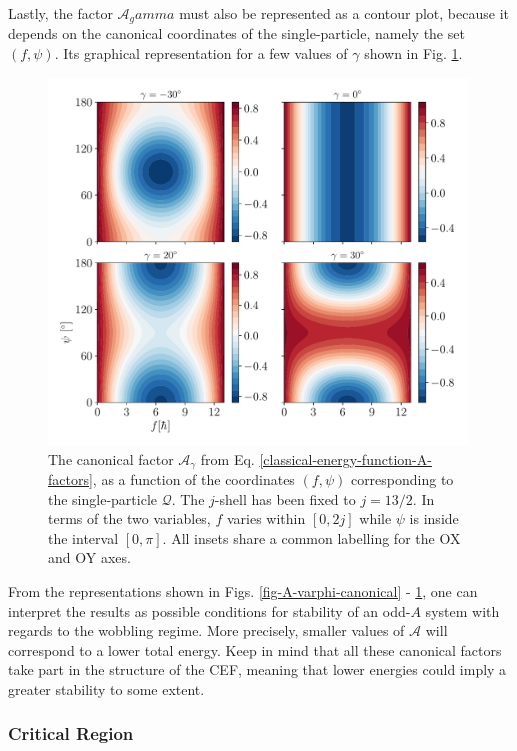 Lastly, the factor $\mathcal{A}_gamma$ must also be represented as a contour plot, because it depends on the canonical coordinates of the single-particle, namely the set $(f,\psi)$. Its graphical representation for a few values of $\gamma$ shown in Fig. \ref{fig-A-gamma-canonical}.
\begin{figure}
    \centering
    \includegraphics[width=0.99\textwidth]{Chapters/Figures/A_gamma.pdf}
    \caption{The canonical factor $\mathcal{A}_\gamma$ from Eq. \ref{classical-energy-function-A-factors}, as a function of the coordinates $(f,\psi)$ corresponding to the single-particle $\mathcal{Q}$. The $j$-shell has been fixed to $j=13/2$. In terms of the two variables, $f$ varies within $[0,2j]$ while $\psi$ is inside the interval $[0,\pi]$. All insets share a common labelling for the OX and OY axes.}
    \label{fig-A-gamma-canonical}
\end{figure}

From the representations shown in Figs. \ref{fig-A-varphi-canonical} - \ref{fig-A-gamma-canonical}, one can interpret the results as possible conditions for stability of an odd-$A$ system with regards to the wobbling regime. More precisely, smaller values of $\mathcal{A}$ will correspond to a lower total energy. Keep in mind that all these canonical factors take part in the structure of the CEF, meaning that lower energies could imply a greater stability to some extent.

\subsubsection{Critical Region}

